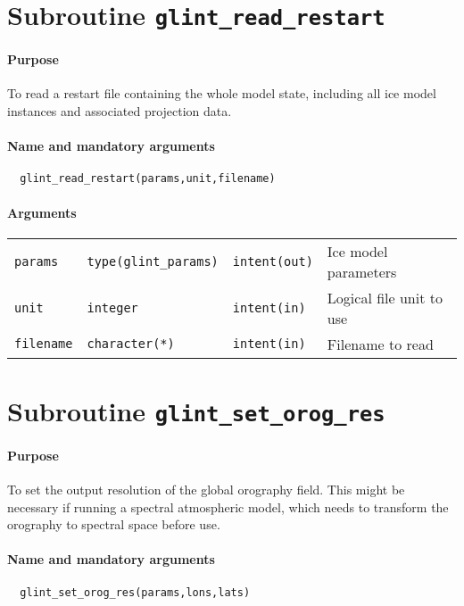 \section{Subroutine \texttt{glint\_read\_restart}}
%
\paragraph{Purpose}
%
To read a restart file containing the whole model state, including all ice
model instances and associated projection data.
%
\paragraph{Name and mandatory arguments}
%
\begin{verbatim}
  glint_read_restart(params,unit,filename)
\end{verbatim}
%
\paragraph{Arguments}
%
\begin{center}
\begin{tabular}{llll}
\texttt{params} & \texttt{type(glint\_params)} & \texttt{intent(out)} &
Ice model parameters \\
\texttt{unit} & \texttt{integer} & \texttt{intent(in)} & Logical file unit to
use \\
\texttt{filename} & \texttt{character(*)} & \texttt{intent(in)} & Filename to
read \\
\end{tabular}
\end{center}
%
\section{Subroutine \texttt{glint\_set\_orog\_res}}
%
\paragraph{Purpose}
%
To set the output resolution of the global orography field. This might be necessary
if running a spectral atmospheric model, which needs to transform the
orography to spectral space before use.
%
\paragraph{Name and mandatory arguments}
%
\begin{verbatim}
  glint_set_orog_res(params,lons,lats)
\end{verbatim}

